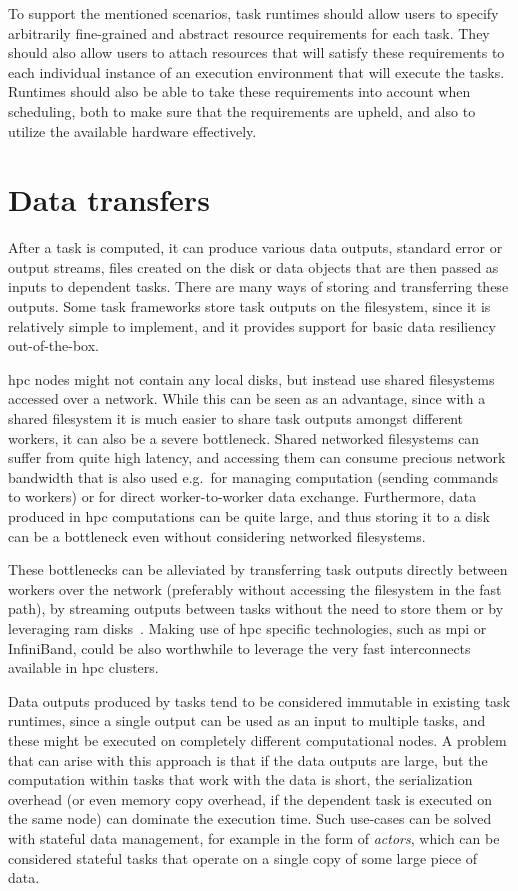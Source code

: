 To support the mentioned scenarios, task runtimes should allow users to specify arbitrarily
fine-grained and abstract resource requirements for each task. They should also allow users to
attach resources that will satisfy these requirements to each individual instance of an execution
environment that will execute the tasks. Runtimes should also be able to take these requirements
into account when scheduling, both to make sure that the requirements are upheld, and also to
utilize the available hardware effectively.

\section{Data transfers}
After a task is computed, it can produce various data outputs, standard error or output streams,
files created on the disk or data objects that are then passed as inputs to dependent tasks. There
are many ways of storing and transferring these outputs. Some task frameworks store task outputs on
the filesystem, since it is relatively simple to implement, and it provides support for basic data
resiliency out-of-the-box.

\gls{hpc} nodes might not contain any local disks, but instead use shared
filesystems accessed over a network. While this can be seen as an advantage, since with a shared
filesystem it is much easier to share task outputs amongst different workers, it can also be a
severe bottleneck. Shared networked filesystems can suffer from quite high latency, and accessing
them can consume precious network bandwidth that is also used e.g.\ for managing computation
(sending commands to workers) or for direct worker-to-worker data exchange. Furthermore, data
produced in \gls{hpc} computations can be quite large, and thus storing it to a
disk can be a bottleneck even without considering networked filesystems.

These bottlenecks can be alleviated by transferring task outputs directly between workers over the
network (preferably without accessing the filesystem in the fast path), by streaming outputs
between tasks without the need to store them or by leveraging \gls{ram}
disks~\cite{hyperloom}. Making use of \gls{hpc} specific technologies,
such as \gls{mpi} or InfiniBand, could be also worthwhile to leverage the very
fast interconnects available in \gls{hpc} clusters.

Data outputs produced by tasks tend to be considered immutable in existing task runtimes, since a
single output can be used as an input to multiple tasks, and these might be executed on completely
different computational nodes. A problem that can arise with this approach is that if the data
outputs are large, but the computation within tasks that work with the data is short, the
serialization overhead (or even memory copy overhead, if the dependent task is executed on the same
node) can dominate the execution time. Such use-cases can be solved with stateful data management,
for example in the form of \emph{actors}, which can be considered stateful tasks that
operate on a single copy of some large piece of data.

